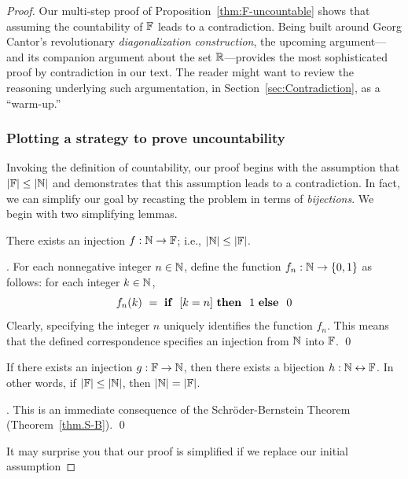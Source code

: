 \begin{proof}
Our multi-step proof of Proposition~\ref{thm:F-uncountable} shows that assuming the countability of $\mathbb{F}$ leads to a contradiction.  Being built around Georg Cantor's revolutionary {\it diagonalization construction}, the upcoming argument---and its companion argument about the set $\mathbb{R}$---provides the most sophisticated proof by contradiction in our text.  The reader might want to review the reasoning underlying such argumentation, in Section~\ref{sec:Contradiction}, as a ``warm-up.''

\subsubsection{Plotting a strategy to prove uncountability}
\label{sec:the-diag-strategy}

Invoking the definition of countability, our proof begins with the assumption that $|\mathbb{F}| \leq |\mathbb{N}|$ and demonstrates that this assumption leads to a contradiction.  In fact, we can simplify our goal by recasting the problem in terms of {\em bijections}.  We begin with two simplifying lemmas.

\begin{lemma}
\label{lem:N-leq-F}
There exists an injection $f: \mathbb{N} \rightarrow \mathbb{F}$; i.e., $|\mathbb{N}| \leq |\mathbb{F}|$.
\end{lemma}

.
For each nonnegative integer $n \in \mathbb{N}$, define the function $f_n: \mathbb{N} \rightarrow \{0,1\}$ as follows: for each integer $k \in \mathbb{N}$,
\[ f_n(k) \ = \ \mbox{\bf if } \ [k=n] \ \mbox{\bf then } \ 1
\ \mbox{\bf else } \ 0
\]
Clearly, specifying the integer $n$ uniquely identifies the function $f_n$.  This means that the defined correspondence specifies an injection from $\mathbb{N}$ into $\mathbb{F}$.  \qed

\begin{lemma}
\label{lem:N-=-F}
If there exists an injection $g: \mathbb{F} \rightarrow \mathbb{N}$, then there exists a bijection $h: \mathbb{N} \leftrightarrow \mathbb{F}$.  In other words, if $|\mathbb{F}| \leq |\mathbb{N}|$, then $|\mathbb{N}| = |\mathbb{F}|$.
\end{lemma}

.
This is an immediate consequence of the Schr\"{o}der-Bernstein Theorem (Theorem~\ref{thm.S-B}).  \qed

\medskip

It may surprise you that our proof is simplified if we replace our initial assumption

\smallskip


\end{proof}
